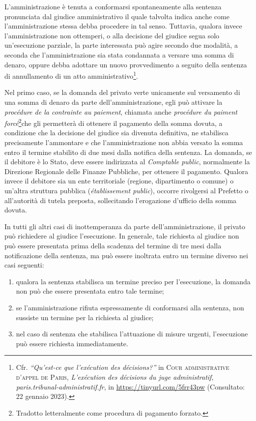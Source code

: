 \documentclass[12pt,it,a4paper,]{report}
\providecommand{\tightlist}{%
  \setlength{\itemsep}{0pt}\setlength{\parskip}{0pt}}
\begin{document}
L'amministrazione è tenuta a conformarsi spontaneamente alla sentenza
pronunciata dal giudice amministrativo il quale talvolta indica anche
come l'amministrazione stessa debba procedere in tal senso. Tuttavia,
qualora invece l'amministrazione non ottemperi, o alla decisione del
giudice segua solo un'esecuzione parziale, la parte interessata può
agire secondo due modalità, a seconda che l'amministrazione sia stata
condannata a versare una somma di denaro, oppure debba adottare un nuovo
provvedimento a seguito della sentenza di annullamento di un atto
amministrativo\footnote{Cfr. \emph{``Qu'est-ce que l'exécution des
  décisions?''} in \textsc{Cour administrative d'appel de Paris},
  \emph{L'exécution des décisions du juge administratif},
  \emph{paris.tribunal-administratif.fr}, in
  \url{https://tinyurl.com/5frr43pw} (Consultato: 22 gennaio 2023).}.

Nel primo caso, se la domanda del privato verte unicamente sul
versamento di una somma di denaro da parte dell'amministrazione, egli
può attivare la \emph{procédure de la contrainte au paiement}, chiamata
anche \emph{procédure du paiment forcé}\footnote{Tradotto letteralmente
  come procedura di pagamento forzato.}che gli permetterà di ottenere il
pagamento della somma dovuta, a condizione che la decisione del giudice
sia divenuta definitiva, ne stabilisca precisamente l'ammontare e che
l'amministrazione non abbia versato la somma entro il termine stabilito
di due mesi dalla notifica della sentenza. La domanda, se il debitore è
lo Stato, deve essere indirizzata al \emph{Comptable public},
normalmente la Direzione Regionale delle Finanze Pubbliche, per ottenere
il pagamento. Qualora invece il debitore sia un ente territoriale
(regione, dipartimento o comune) o un'altra struttura pubblica
(\emph{établissement public}), occorre rivolgersi al Prefetto o
all'autorità di tutela preposta, sollecitando l'erogazione d'ufficio
della somma dovuta.

In tutti gli altri casi di inottemperanza da parte dell'amministrazione,
il privato può richiedere al giudice l'esecuzione. In generale, tale
richiesta al giudice non può essere presentata prima della scadenza del
termine di tre mesi dalla notificazione della sentenza, ma può essere
inoltrata entro un termine diverso nei casi seguenti:

\begin{enumerate}
\def\labelenumi{\arabic{enumi})}
\tightlist
\item
  qualora la sentenza stabilisca un termine preciso per l'esecuzione, la
  domanda non può che essere presentata entro tale termine;
\item
  se l'amministrazione rifiuta espressamente di conformarsi alla
  sentenza, non sussiste un termine per la richiesta al giudice;
\item
  nel caso di sentenza che stabilisca l'attuazione di misure urgenti,
  l'esecuzione può essere richiesta immediatamente.
\end{enumerate}
\end{document}
